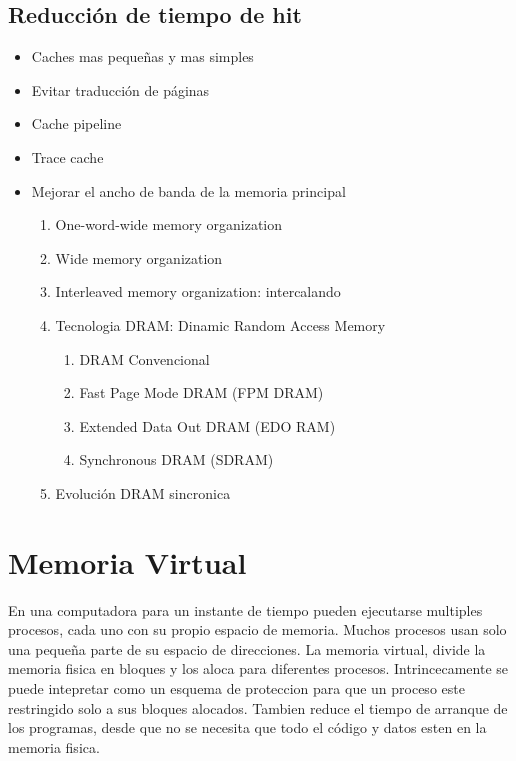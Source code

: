 \documentclass{article}
\begin{document}
\subsection{Reducción de tiempo de hit}
\begin{itemize}
    \item Caches mas pequeñas y mas simples
    \item Evitar traducción de páginas
    \item Cache pipeline
    \item Trace cache
    \item Mejorar el ancho de banda de la memoria principal
    \begin{enumerate}
        \item One-word-wide memory organization
        \item Wide memory organization
        \item Interleaved memory organization: intercalando
        \item Tecnologia DRAM: Dinamic Random Access Memory
        \begin{enumerate}
            \item DRAM Convencional
            \item Fast Page Mode DRAM (FPM DRAM)
            \item Extended Data Out DRAM (EDO RAM)
            \item Synchronous DRAM (SDRAM)
        \end{enumerate}
        \item Evolución DRAM sincronica
        
    \end{enumerate}
    
\end{itemize}


\newpage
\section{Memoria Virtual}

En una computadora para un instante de tiempo pueden ejecutarse multiples procesos, cada uno con su propio espacio de memoria. Muchos procesos usan solo una pequeña parte de su espacio de direcciones. 
La memoria virtual, divide la memoria fisica en bloques y los aloca para diferentes procesos. Intrincecamente se puede intepretar como un esquema de proteccion para que un proceso este restringido solo a sus bloques alocados.
Tambien reduce el tiempo de arranque de los programas, desde que no se necesita que todo el código y datos esten en la memoria fisica.
\end{document}
